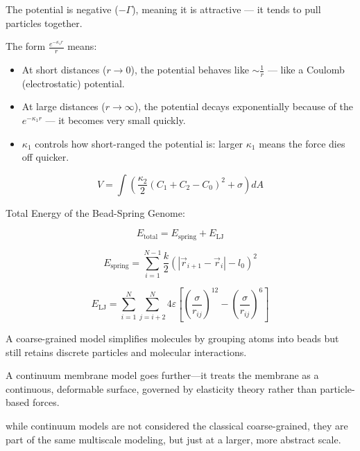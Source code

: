 \documentclass[12pt]{article}
\begin{document}
\begin{flushleft}
The potential is negative (\( -\Gamma \)), meaning it is attractive — it tends to pull particles together.

\noindent The form \( \frac{e^{-\kappa_1 r}}{r} \) means:

\begin{itemize}
    \item At short distances (\( r \to 0 \)), the potential behaves like \( \sim \frac{1}{r} \) — like a Coulomb (electrostatic) potential.
    \item At large distances (\( r \to \infty \)), the potential decays exponentially because of the \( e^{-\kappa_1 r} \) — it becomes very small quickly.
    \item \( \kappa_1 \) controls how short-ranged the potential is: larger \( \kappa_1 \) means the force dies off quicker.
\end{itemize}



\begin{equation}
V= \int \left( \frac{\kappa_2}{2} (C_1 + C_2 - C_0)^2 + \sigma \right) dA
\end{equation}


Total Energy of the Bead-Spring Genome:

\begin{equation}
E_{\text{total}} = E_{\text{spring}} + E_{\text{LJ}}
\end{equation}


\begin{equation}
E_{\text{spring}} = \sum_{i=1}^{N-1} \frac{k}{2} \left( \left| \vec{r}_{i+1} - \vec{r}_i \right| - l_0 \right)^2
\end{equation}


\begin{equation}
E_{\text{LJ}} = \sum_{i=1}^{N} \sum_{j=i+2}^{N} 4\varepsilon \left[ \left( \frac{\sigma}{r_{ij}} \right)^{12} - \left( \frac{\sigma}{r_{ij}} \right)^6 \right]
\end{equation}

A coarse-grained model simplifies molecules by grouping atoms into beads but still retains discrete particles and molecular interactions.

A continuum membrane model goes further—it treats the membrane as a continuous, deformable surface, governed by elasticity theory rather than particle-based forces.

while continuum models are not considered the classical coarse-grained, they are part of the same multiscale modeling, but just at a larger, more abstract scale.










\end{flushleft}
\end{document}
